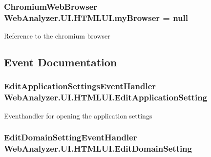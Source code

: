 \subsubsection[{my\+Browser}]{\setlength{\rightskip}{0pt plus 5cm}Chromium\+Web\+Browser Web\+Analyzer.\+U\+I.\+H\+T\+M\+L\+U\+I.\+my\+Browser = null\hspace{0.3cm}{\ttfamily [private]}}\label{class_web_analyzer_1_1_u_i_1_1_h_t_m_l_u_i_a5f4700cfc8d03cdc4927814acbd0a5dc}


Reference to the chromium browser 



\subsection{Event Documentation}
\hypertarget{class_web_analyzer_1_1_u_i_1_1_h_t_m_l_u_i_ab0a670a0a2407499af7b073c9f180657}{}
\subsubsection[{Edit\+Application\+Setting}]{\setlength{\rightskip}{0pt plus 5cm}Edit\+Application\+Settings\+Event\+Handler Web\+Analyzer.\+U\+I.\+H\+T\+M\+L\+U\+I.\+Edit\+Application\+Setting}\label{class_web_analyzer_1_1_u_i_1_1_h_t_m_l_u_i_ab0a670a0a2407499af7b073c9f180657}


Eventhandler for opening the application settings 

\hypertarget{class_web_analyzer_1_1_u_i_1_1_h_t_m_l_u_i_aec067a24868c0ce06c3dd5ca4caccd8b}{}
\subsubsection[{Edit\+Domain\+Setting}]{\setlength{\rightskip}{0pt plus 5cm}Edit\+Domain\+Setting\+Event\+Handler Web\+Analyzer.\+U\+I.\+H\+T\+M\+L\+U\+I.\+Edit\+Domain\+Setting}\label{class_web_analyzer_1_1_u_i_1_1_h_t_m_l_u_i_aec067a24868c0ce06c3dd5ca4caccd8b}


